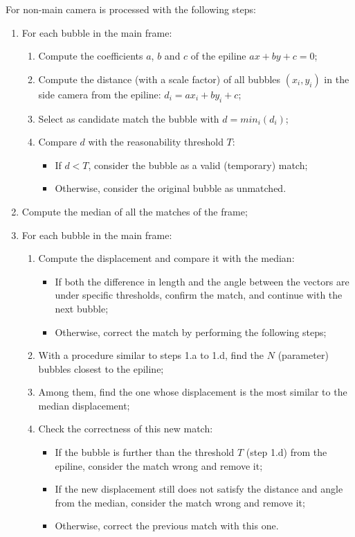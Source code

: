 For non-main camera is processed with the following steps:
\begin{enumerate}
	\itemsep 0em
	\item For each bubble in the main frame:
	      \begin{enumerate}
		      \item Compute the coefficients $a$, $b$ and $c$ of the epiline $ax+by+c{=}0$;
		      \item Compute the distance (with a scale factor) of all bubbles $(x_i, y_i)$ in the side camera from the epiline: $d_i = ax_i + by_i + c$;
		      \item Select as candidate match the bubble with $d=min_i(d_i)$;
		      \item Compare $d$ with the reasonability threshold $T$:
		            \begin{itemize}
			            \item If $d<T$, consider the bubble as a valid (temporary) match;
			            \item Otherwise, consider the original bubble as unmatched.
		            \end{itemize}
	      \end{enumerate}
	\item Compute the median of all the matches of the frame;
	\item For each bubble in the main frame:
	      \begin{enumerate}
		      \item Compute the displacement and compare it with the median:
		            \begin{itemize}
			            \item If both the difference in length and the angle between the vectors are under specific thresholds, confirm the match, and continue with the next bubble;
			            \item Otherwise, correct the match by performing the following steps;
		            \end{itemize}
		      \item With a procedure similar to steps 1.a to 1.d, find the $N$ (parameter) bubbles closest to the epiline;
		      \item Among them, find the one whose displacement is the most similar to the median displacement;
		      \item Check the correctness of this new match:
		            \begin{itemize}
			            \item If the bubble is further than the threshold $T$ (step 1.d) from the epiline, consider the match wrong and remove it;
			            \item If the new displacement still does not satisfy the distance and angle from the median, consider the match wrong and remove it;
			            \item Otherwise, correct the previous match with this one.
		            \end{itemize}
	      \end{enumerate}
\end{enumerate}

